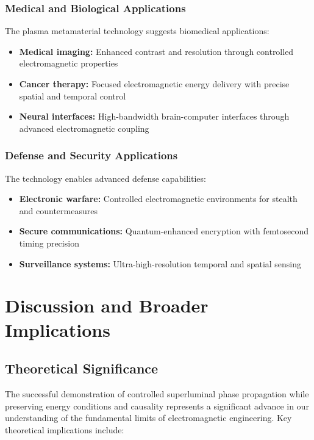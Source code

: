\documentclass[aps,prl,reprint,groupedaddress,floatfix]{revtex4-1}
\begin{document}
\subsubsection{Medical and Biological Applications}

The plasma metamaterial technology suggests biomedical applications:
\begin{itemize}
    \item \textbf{Medical imaging:} Enhanced contrast and resolution through controlled electromagnetic properties
    \item \textbf{Cancer therapy:} Focused electromagnetic energy delivery with precise spatial and temporal control
    \item \textbf{Neural interfaces:} High-bandwidth brain-computer interfaces through advanced electromagnetic coupling
\end{itemize}

\subsubsection{Defense and Security Applications}

The technology enables advanced defense capabilities:
\begin{itemize}
    \item \textbf{Electronic warfare:} Controlled electromagnetic environments for stealth and countermeasures
    \item \textbf{Secure communications:} Quantum-enhanced encryption with femtosecond timing precision
    \item \textbf{Surveillance systems:} Ultra-high-resolution temporal and spatial sensing
\end{itemize}

\section{Discussion and Broader Implications}

\subsection{Theoretical Significance}

The successful demonstration of controlled superluminal phase propagation while preserving energy conditions and causality represents a significant advance in our understanding of the fundamental limits of electromagnetic engineering. Key theoretical implications include:
\end{document}
